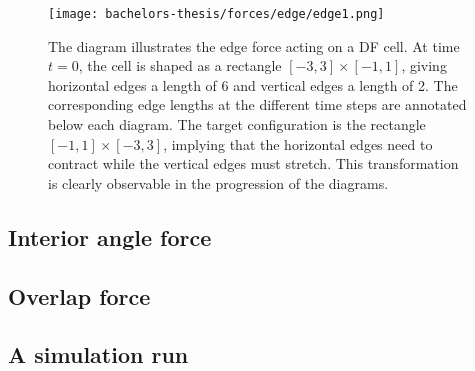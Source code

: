\begin{figure}[h!]
	\begin{center}
		\texttt{[image: bachelors-thesis/forces/edge/edge1.png]}
		\caption{The diagram illustrates the edge force acting on a DF cell.
		At time $t=0$, the cell is shaped as a rectangle $[-3,3]\times [-1,1]$, giving horizontal edges a length of 6 and vertical edges a length of 2.
		The corresponding edge lengths at the different time steps are annotated below each diagram.
		The target configuration is the rectangle $[-1,1]\times [-3,3]$, implying that the horizontal edges need to contract while the vertical edges must stretch.
		This transformation is clearly observable in the progression of the diagrams.
		}
		\label{fig:edgeForce}
	\end{center}
\end{figure}





\subsection{Interior angle force}

\subsection{Overlap force}

\subsection{A simulation run}
